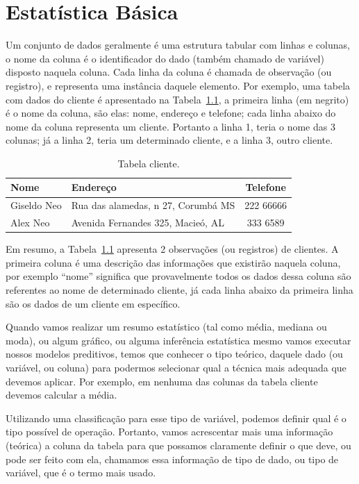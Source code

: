 \documentclass[a4paper,12pt]{book}
\begin{document}
\chapter{Estatística Básica}

Um conjunto de dados geralmente é uma estrutura tabular com linhas e colunas, o nome da coluna é o identificador do dado (também chamado de variável) disposto naquela coluna. Cada linha da coluna é chamada de observação (ou registro), e representa uma instância daquele elemento. Por exemplo, uma tabela com dados do cliente é apresentado na Tabela~\ref{tbl:cliente}, a primeira linha (em negrito) é o nome da coluna, são elas: nome, endereço e telefone; cada linha abaixo do nome da coluna representa um cliente. Portanto a linha 1, teria o nome das 3 colunas; já a linha 2, teria um determinado cliente, e a linha 3, outro cliente.

\begin{table}
	\centering
	\caption{Tabela cliente.}
	\begin{tabular}{|l|l|c|}
	\hline
	\textbf{Nome} & \textbf{Endereço} & \textbf{Telefone} \\
	\hline
	Giseldo Neo & Rua das alamedas, n 27, Corumbá MS & 222 66666 \\
	\hline
	Alex Neo & Avenida Fernandes 325, Macieó, AL& 333 6589 \\
	\hline
	\end{tabular}
	\label{tbl:cliente}
\end{table}

Em resumo, a Tabela~\ref{tbl:cliente} apresenta 2 observações (ou registros) de clientes. A primeira coluna é uma descrição das informações que existirão naquela coluna, por exemplo ``nome'' significa que provavelmente todos os dados dessa coluna são referentes ao nome de determinado cliente, já cada linha abaixo da primeira linha são os dados de um cliente em específico.

Quando vamos realizar um resumo estatístico (tal como média, mediana ou moda), ou algum gráfico, ou alguma inferência estatística mesmo vamos executar nossos modelos preditivos, temos que conhecer o tipo teórico, daquele dado (ou variável, ou coluna) para podermos selecionar qual a técnica mais adequada que devemos aplicar. Por exemplo, em nenhuma das colunas da tabela cliente devemos calcular a média.

Utilizando uma classificação para esse tipo de variável, podemos definir qual é o tipo possível de operação. Portanto, vamos acrescentar mais uma informação (teórica) a coluna da tabela para que possamos claramente definir o que deve, ou pode ser feito com ela, chamamos essa informação de tipo de dado, ou tipo de variável, que é o termo mais usado.
\end{document}
